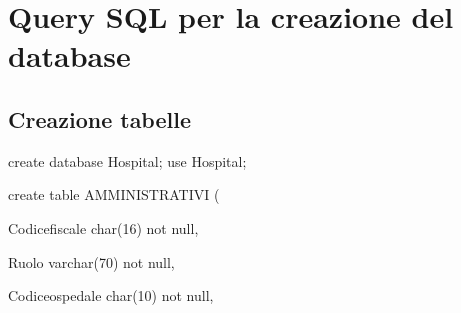 \documentclass[a4paper,12pt]{report}
\begin{document}
\begin{figure}[p]
\end{figure}

\appendix 
\chapter{Query SQL per la creazione del database}
\section{Creazione tabelle}

create database Hospital;\newline
use Hospital;\newline

\noindent create table AMMINISTRATIVI (

     Codice\textunderscore fiscale char(16) not null,

     Ruolo varchar(70) not null,

     Codice\textunderscore ospedale char(10) not null,
\end{document}
